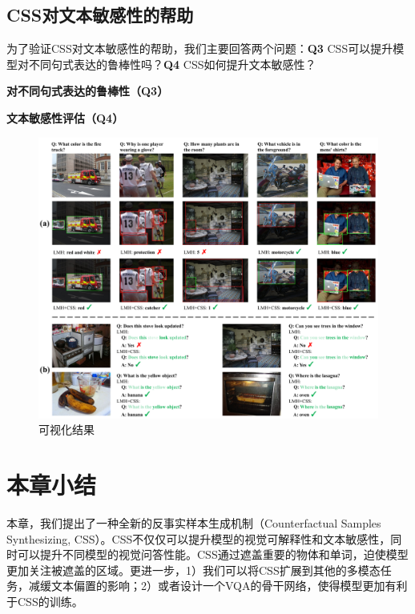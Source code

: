 \begin{table}[tbp]
    \begin{center}
    \end{center}
    \caption{左：VQA-CP-Rephrasing数据集中的$CS(k)$；右：VQA-CP v2测试集中$\mathcal{CI}$分数}
    \label{ch7:tab:ablative_c}
\end{table}



\subsection{CSS对文本敏感性的帮助}
为了验证CSS对文本敏感性的帮助，我们主要回答两个问题：\textbf{Q3} CSS可以提升模型对不同句式表达的鲁棒性吗？\textbf{Q4} CSS如何提升文本敏感性？

\textbf{对不同句式表达的鲁棒性（Q3）}

\textbf{文本敏感性评估（Q4）}

\begin{figure}[t]
    \centering
        \includegraphics[width=\linewidth]{chapter7/res/visualization.pdf}
    \caption{可视化结果}
    \label{ch7:fig:visualization}
\end{figure}


\section{本章小结}
本章，我们提出了一种全新的反事实样本生成机制（Counterfactual Samples Synthesizing, CSS）。CSS不仅仅可以提升模型的视觉可解释性和文本敏感性，同时可以提升不同模型的视觉问答性能。CSS通过遮盖重要的物体和单词，迫使模型更加关注被遮盖的区域。更进一步，1）我们可以将CSS扩展到其他的多模态任务，减缓文本偏置的影响；2）或者设计一个VQA的骨干网络，使得模型更加有利于CSS的训练。